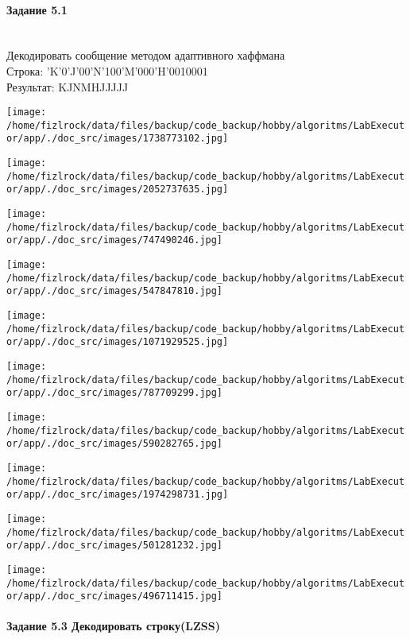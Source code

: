 \documentclass[a4paper, 12pt]{article}
\begin{document}
\paragraph{Задание 5.1}

\\ 

Декодировать сообщение методом адаптивного хаффмана \\
Строка: 
'K'0'J'00'N'100'M'000'H'0010001\\
Результат: KJNMHJJJJJ

\texttt{[image: /home/fizlrock/data/files/backup/code\_backup/hobby/algoritms/LabExecutor/app/./doc\_src/images/1738773102.jpg]}

\texttt{[image: /home/fizlrock/data/files/backup/code\_backup/hobby/algoritms/LabExecutor/app/./doc\_src/images/2052737635.jpg]}

\texttt{[image: /home/fizlrock/data/files/backup/code\_backup/hobby/algoritms/LabExecutor/app/./doc\_src/images/747490246.jpg]}

\texttt{[image: /home/fizlrock/data/files/backup/code\_backup/hobby/algoritms/LabExecutor/app/./doc\_src/images/547847810.jpg]}

\texttt{[image: /home/fizlrock/data/files/backup/code\_backup/hobby/algoritms/LabExecutor/app/./doc\_src/images/1071929525.jpg]}

\texttt{[image: /home/fizlrock/data/files/backup/code\_backup/hobby/algoritms/LabExecutor/app/./doc\_src/images/787709299.jpg]}

\texttt{[image: /home/fizlrock/data/files/backup/code\_backup/hobby/algoritms/LabExecutor/app/./doc\_src/images/590282765.jpg]}

\texttt{[image: /home/fizlrock/data/files/backup/code\_backup/hobby/algoritms/LabExecutor/app/./doc\_src/images/1974298731.jpg]}

\texttt{[image: /home/fizlrock/data/files/backup/code\_backup/hobby/algoritms/LabExecutor/app/./doc\_src/images/501281232.jpg]}

\texttt{[image: /home/fizlrock/data/files/backup/code\_backup/hobby/algoritms/LabExecutor/app/./doc\_src/images/496711415.jpg]}
\pagebreak
\paragraph{Задание 5.3 Декодировать строку(LZSS)\\}
\end{document}
